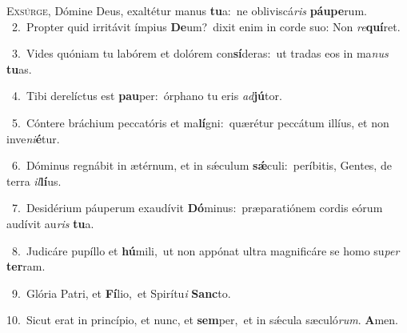 \lettrine{\initial\textcolor{\initialcolor}{E}}{xsúrge,} Dómine Deus, exaltétur manus \textbf{tu}\-a:~\star ne obliviscá\textit{ris} \textbf{páu}\-\textbf{pe}rum.\\
{\numbfont\textcolor{\numbcolor}{~2.}}~Propter quid irritávit ímpius \textbf{De}\-um?~\star dixit enim in corde suo: Non \textit{re}\-\textbf{quí}ret.\par
{\numbfont\textcolor{\numbcolor}{~3.}}~Vides quóniam tu labórem et dolórem con\-\textbf{sí}\-deras:~\star ut tradas eos in ma\textit{nus} \textbf{tu}\-as.\par
{\numbfont\textcolor{\numbcolor}{~4.}}~Tibi derelíctus est \textbf{pau}\-per:~\star órphano tu eris \textit{ad}\-\textbf{jú}tor.\par
{\numbfont\textcolor{\numbcolor}{~5.}}~Cóntere bráchium peccatóris et ma\-\textbf{lí}\-gni:~\star quærétur peccátum illíus, et non inve\-\textit{ni}\-\textbf{é}tur.\par
{\numbfont\textcolor{\numbcolor}{~6.}}~Dóminus regnábit in ætérnum, et in sǽculum \textbf{sǽ}\-culi:~\star períbitis, Gentes, de terra \textit{il}\-\textbf{lí}us.\par
{\numbfont\textcolor{\numbcolor}{~7.}}~Desidérium páuperum exaudívit \textbf{Dó}\-minus:~\star præparatiónem cordis eórum audívit au\textit{ris} \textbf{tu}\-a.\par
{\numbfont\textcolor{\numbcolor}{~8.}}~Judicáre pupíllo et \textbf{hú}\-mili,~\star ut non appónat ultra magnificáre se homo su\textit{per} \textbf{ter}\-ram.\par
{\numbfont\textcolor{\numbcolor}{~9.}}~Glória Patri, et \textbf{Fí}\-lio,~\star et Spirítu\textit{i} \textbf{Sanc}\-to.\par
{\numbfont\textcolor{\numbcolor}{10.}}~Sicut erat in princípio, et nunc, et \textbf{sem}\-per,~\star et in sǽcula sæculó\-\textit{rum}\-. \textbf{A}\-men.\par
